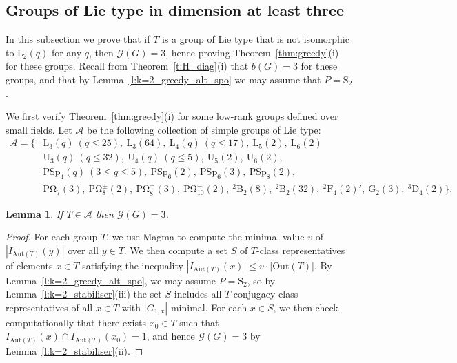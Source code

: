 \documentclass[twoside,a4paper,reqno,11pt]{amsart}
\newcommand{\<}{\langle}
\renewcommand{\>}{\rangle}
\newcommand{\leqs}{\leqslant}
\newcommand{\Aut}{\mathrm{Aut}}
\newcommand{\Out}{\mathrm{Out}}
\newcommand{\PSp}{\mathrm{PSp}}
\newcommand{\POmega}{\mathrm{P\Omega}}
\newcommand{\LL}{\mathrm{L}}
\newcommand{\UU}{\mathrm{U}}
\newcommand{\Sn}{\mathrm{S}}
\newtheorem{lem}[thm]{Lemma}
\theoremstyle{definition}
\begin{document}
\subsection{Groups of Lie type in dimension at least three}

In this subsection we prove that if $T$ is a group of Lie type that is not isomorphic to $\LL_2(q)$ for any $q$,  then $\mathcal{G}(G) = 3$, hence proving Theorem~\ref{thm:greedy}(i) for these groups. Recall from Theorem~\ref{t:H_diag}(i) that $b(G) = 3$ for these groups, and that by Lemma~\ref{l:k=2_greedy_alt_spo} we may assume that $P = \Sn_2$.

We first verify Theorem~\ref{thm:greedy}(i) for some low-rank groups defined over small fields. Let $\mathcal{A}$ be the following collection of simple groups of Lie type: 
\begin{equation*}
\begin{aligned}
    \mathcal{A} = \{&\LL_3(q)\ (q\leqs 25),\ \LL_3(64),\ \LL_4(q)\ (q\leqs 17),\ \LL_5(2), \ \LL_6(2)\\
    &\UU_3(q)\ (q\leqs 32),\ \UU_4(q)\ (q\leqs 5),\ \UU_5(2), \ \UU_6(2),\\ 
    & \PSp_4(q)\ (3\leqs q\leqs 5),\ \PSp_6(2),\ \PSp_6(3), \ \PSp_8(2),\\ &  \POmega_7(3), \ \POmega_8^\pm(2), \ \POmega_8^+(3),\  \POmega^{-}_{10}(2),
    \ {^2}\mathrm{B}_2(8),\ {^2}\mathrm{B}_2(32), \ {^2}\mathrm{F}_4(2)',\ \mathrm{G}_2(3),\ {^3}\mathrm{D}_4(2)\}.
\end{aligned}
\end{equation*}

\begin{lem}
	\label{l:comp}
	If $T\in\mathcal{A}$ then $\mathcal{G}(G) = 3$.
\end{lem}

\begin{proof}
	For each group $T$, we use {\sc Magma} to compute the minimal value $v$ of
    $|I_{\Aut(T)}(y)|$ over all $y \in T$. 
	We then compute a set $S$ of $T$-class representatives of elements $x\in T$ satisfying the inequality $|I_{\Aut(T)}(x)| \leqs v \cdot |\Out(T)|$. By Lemma~\ref{l:k=2_greedy_alt_spo}, we may assume $P = \Sn_2$, so by Lemma~\ref{l:k=2_stabiliser}(iii) the set $S$ includes all $T$-conjugacy class representatives of all $x\in T$ with $|G_{1,x}|$ minimal. For each $x\in S$, we then check computationally that there exists $x_0\in T$ such that $I_{\Aut(T)}(x)\cap I_{\Aut(T)}(x_0) = 1$, and hence $\mathcal{G}(G) = 3$ by Lemma~\ref{l:k=2_stabiliser}(ii).
\end{proof}
\end{document}
